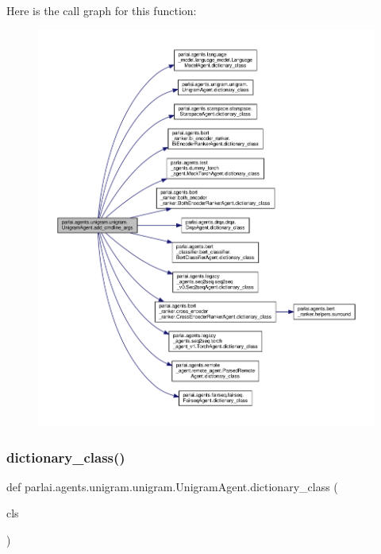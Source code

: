 Here is the call graph for this function\+:
\nopagebreak
\begin{figure}[H]
\begin{center}
\leavevmode
\includegraphics[width=350pt]{classparlai_1_1agents_1_1unigram_1_1unigram_1_1UnigramAgent_a975b292cb31540e198a220d3c9bd7ea5_cgraph}
\end{center}
\end{figure}
\mbox{\label{classparlai_1_1agents_1_1unigram_1_1unigram_1_1UnigramAgent_a832c1e669ba04ca3c6258216cc82bdca}} 
\subsubsection{\texorpdfstring{dictionary\+\_\+class()}{dictionary\_class()}}
{\footnotesize\ttfamily def parlai.\+agents.\+unigram.\+unigram.\+Unigram\+Agent.\+dictionary\+\_\+class (\begin{DoxyParamCaption}\item[{}]{cls }\end{DoxyParamCaption})}

